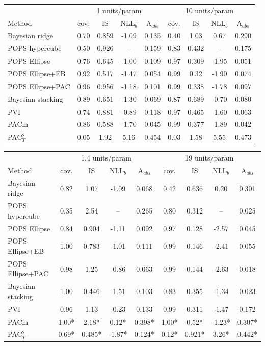 \begin{tabular}{lcccccccc}
\toprule
 & \multicolumn{4}{c}{1 units/param} & \multicolumn{4}{c}{10 units/param} \\
Method & cov. & IS & NLL$_b$ & A$_{abs}$ & cov. & IS & NLL$_b$ & A$_{abs}$ \\
\midrule
Bayesian ridge & 0.70 & 0.859 & -1.09 & 0.135 & 0.40 & 1.03 & 0.67 & 0.290 \\
POPS hypercube & 0.50 & 0.926 & -- & 0.159 & 0.83 & 0.432 & -- & 0.175 \\
POPS Ellipse & 0.76 & 0.645 & -1.00 & 0.109 & 0.97 & 0.309 & -1.95 & 0.051 \\
POPS Ellipse+EB & 0.92 & 0.517 & -1.47 & 0.054 & 0.99 & 0.32 & -1.90 & 0.074 \\
POPS Ellipse+PAC & 0.96 & 0.956 & -1.18 & 0.101 & 0.99 & 0.338 & -1.78 & 0.097 \\
Bayesian stacking & 0.89 & 0.651 & -1.30 & 0.069 & 0.87 & 0.689 & -0.70 & 0.080 \\
PVI & 0.74 & 0.881 & -0.89 & 0.118 & 0.97 & 0.465 & -1.60 & 0.063 \\
PACm & 0.86 & 0.588 & -1.70 & 0.045 & 0.99 & 0.377 & -1.89 & 0.042 \\
PAC$^2_T$ & 0.05 & 1.92 & 5.16 & 0.454 & 0.03 & 1.58 & 5.55 & 0.473 \\
\bottomrule
\end{tabular}

\begin{tabular}{lcccccccc}
\toprule
 & \multicolumn{4}{c}{1.4 units/param} & \multicolumn{4}{c}{19 units/param} \\
Method & cov. & IS & NLL$_b$ & A$_{abs}$ & cov. & IS & NLL$_b$ & A$_{abs}$ \\
\midrule
Bayesian ridge & 0.82 & 1.07 & -1.09 & 0.068 & 0.42 & 0.636 & 0.20 & 0.301 \\
POPS hypercube & 0.35 & 2.54 & -- & 0.265 & 0.80 & 0.312 & -- & 0.025 \\
POPS Ellipse & 0.84 & 0.904 & -1.11 & 0.092 & 0.97 & 0.128 & -2.57 & 0.045 \\
POPS Ellipse+EB & 1.00 & 0.783 & -1.01 & 0.111 & 0.99 & 0.146 & -2.41 & 0.055 \\
POPS Ellipse+PAC & 0.98 & 1.25 & -0.86 & 0.063 & 0.99 & 0.144 & -2.63 & 0.018 \\
Bayesian stacking & 1.00 & 0.446 & -1.51 & 0.103 & 0.83 & 0.355 & -1.34 & 0.023 \\
PVI & 0.96 & 1.13 & -0.23 & 0.133 & 0.99 & 0.311 & -1.47 & 0.172 \\
PACm & 1.00* & 2.18* & 0.12* & 0.398* & 1.00* & 0.52* & -1.23* & 0.307* \\
PAC$^2_T$ & 0.69* & 0.485* & -1.87* & 0.124* & 0.12* & 0.921* & 3.26* & 0.442* \\
\bottomrule
\end{tabular}

